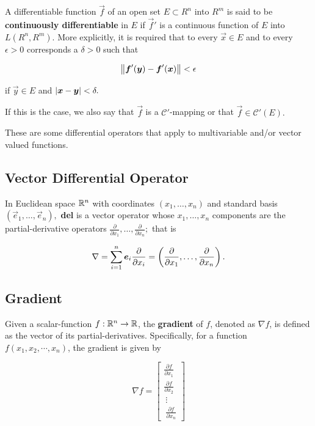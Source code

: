 \documentclass{article}
\begin{document}
\begin{definition}
A \@{differentiable} \@{function} $\vec{f}$ of an \@{open} \@{set} $E \subset R^n$ into $R^m$ is said to be \textbf{continuously differentiable} in $E$ if $\vec{f}'$ is a \@{continuous} function of $E$ into $L(R^n, R^m).$ More explicitly, it is required that to every $\vec{x} \in E$ and to every $\epsilon > 0$ corresponds a $\delta > 0$ such that

\[ \left\lVert \boldsymbol{f}'(\boldsymbol{y}) - \boldsymbol{f}'(\boldsymbol{x}) \right\rVert < \epsilon \]

if $\vec{y} \in E$ and $\left| \boldsymbol{x} - \boldsymbol{y} \right| < \delta.$

If this is the case, we also say that $\vec{f}$ is a $\mathscr{C}'$-mapping or that $\vec{f} \in \mathscr{C}'(E).$
\end{definition}

These are some differential operators that apply to multivariable and/or vector valued functions.

\subsection{Vector Differential Operator}

\begin{definition}[del]
In Euclidean space $\mathbb{R}^n$ with coordinates $(x_1, \dots, x_n)$ and standard basis $(\vec{e}_1, \dots, \vec{e}_n),$ \textbf{del} is a vector operator whose $x_1, \dots, x_n$ \@{components} are the \@{partial-derivative} operators $\frac{\partial}{\partial x_1}, \dots, \frac{\partial}{\partial x_n}; $ that is

\[ \nabla = \sum_{i = 1}^n \boldsymbol{e}_i \frac{\partial}{\partial x_i} = \left(\frac{\partial}{\partial x_1}, \dots, \frac{\partial}{\partial x_n}\right). \]
\end{definition}

\subsection{Gradient}
\begin{definition}[Gradient]
Given a \@{scalar-function} $f : \mathbb{R}^n \to \mathbb{R}$, the \textbf{gradient} of $f$, denoted as $\nabla f$, is defined as the \@{vector} of its \@{partial-derivatives}. Specifically, for a function $f(x_1, x_2, \cdots, x_n)$, the gradient is given by

\[ \nabla f = \begin{bmatrix} \frac{\partial f}{\partial x_1} \\  \frac{\partial f}{\partial x_2} \\\ \vdots \\\ \frac{\partial f}{\partial x_n} \end{bmatrix} \]
\end{definition}
\end{document}
